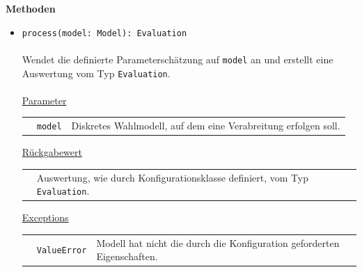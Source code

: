 \documentclass{article}
\begin{document}
\textbf{{Methoden}}
\begin{itemize}\setlength\itemsep{3em}
\item \texttt{process(model: Model): Evaluation}\\\\
Wendet die definierte Parameterschätzung auf \texttt{model} an und erstellt eine Auswertung vom Typ \texttt{Evaluation}.
\\\\
\underline{{Parameter}}\\
\begin{tabular}{lll}
 & \texttt{model} & Diskretes Wahlmodell, auf dem eine Verabreitung erfolgen soll.\\
\end{tabular}

\underline{{Rückgabewert}}\\
\begin{tabular}{lll}
 & Auswertung, wie durch Konfigurationsklasse definiert, vom Typ \texttt{Evaluation}.\\
\end{tabular}

\underline{{Exceptions}}\\
\begin{tabular}{lll}
 & \texttt{ValueError} & Modell hat nicht die durch die Konfiguration geforderten Eigenschaften.\\
\end{tabular}
\end{itemize}

\end{document}
